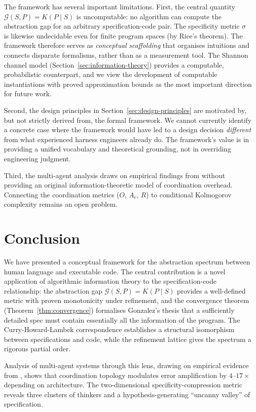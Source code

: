 \documentclass[11pt, a4paper, copyright]{googledeepmind}
\begin{document}
The framework has several important limitations. First, the central quantity $\mathcal{G}(S, P) = K(P \mid S)$ is uncomputable: no algorithm can compute the abstraction gap for an arbitrary specification-code pair. The specificity metric $\sigma$ is likewise undecidable even for finite program spaces (by Rice's theorem). The framework therefore serves as \emph{conceptual scaffolding} that organises intuitions and connects disparate formalisms, rather than as a measurement tool. The Shannon channel model (Section~\ref{sec:information-theory}) provides a computable, probabilistic counterpart, and we view the development of computable instantiations with proved approximation bounds as the most important direction for future work.

Second, the design principles in Section~\ref{sec:design-principles} are motivated by, but not strictly derived from, the formal framework. We cannot currently identify a concrete case where the framework would have led to a design decision \emph{different} from what experienced harness engineers already do. The framework's value is in providing a unified vocabulary and theoretical grounding, not in overriding engineering judgment.

Third, the multi-agent analysis draws on empirical findings from \citet{kim2025scaling} without providing an original information-theoretic model of coordination overhead. Connecting the coordination metrics ($O$, $A_e$, $R$) to conditional Kolmogorov complexity remains an open problem.


\section{Conclusion}

We have presented a conceptual framework for the abstraction spectrum between human language and executable code. The central contribution is a novel application of algorithmic information theory to the specification-code relationship: the abstraction gap $\mathcal{G}(S, P) = K(P \mid S)$ provides a well-defined metric with proven monotonicity under refinement, and the convergence theorem (Theorem~\ref{thm:convergence}) formalises Gonzalez's thesis that a sufficiently detailed spec must contain essentially all the information of the program. The Curry-Howard-Lambek correspondence establishes a structural isomorphism between specifications and code, while the refinement lattice gives the spectrum a rigorous partial order.

Analysis of multi-agent systems through this lens, drawing on empirical evidence from \citet{kim2025scaling}, shows that coordination topology modulates error amplification by $4$--$17\times$ depending on architecture. The two-dimensional specificity-compression metric reveals three clusters of thinkers and a hypothesis-generating ``uncanny valley'' of specification.
\end{document}
